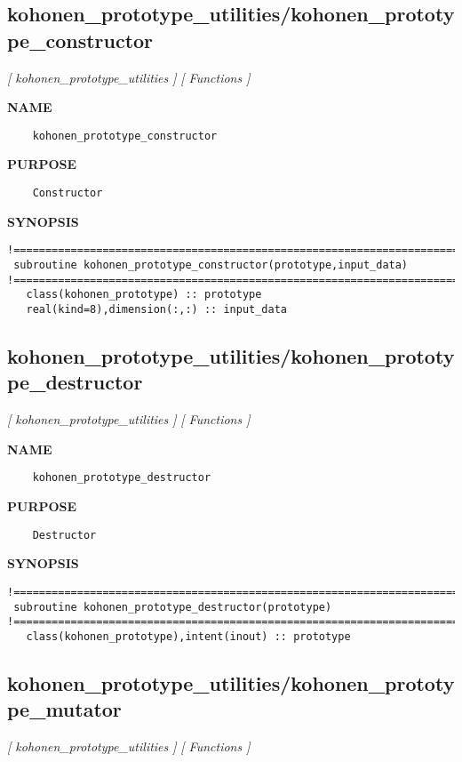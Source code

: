 \documentclass{article}
\begin{document}
\subsection{kohonen\_prototype\_utilities/kohonen\_prototype\_constructor}
\textsl{[ kohonen\_prototype\_utilities ]}
\textsl{[ Functions ]}

\label{ch:robo31}
\label{ch:kohonen_prototype_utilities_kohonen_prototype_constructor}
\textbf{NAME}
\begin{verbatim}
    kohonen_prototype_constructor
\end{verbatim}
\textbf{PURPOSE}
\begin{verbatim}
    Constructor
\end{verbatim}
\textbf{SYNOPSIS}
\begin{verbatim}
!========================================================================================
 subroutine kohonen_prototype_constructor(prototype,input_data)
!========================================================================================
   class(kohonen_prototype) :: prototype
   real(kind=8),dimension(:,:) :: input_data
\end{verbatim}
\newpage
\subsection{kohonen\_prototype\_utilities/kohonen\_prototype\_destructor}
\textsl{[ kohonen\_prototype\_utilities ]}
\textsl{[ Functions ]}

\label{ch:robo32}
\label{ch:kohonen_prototype_utilities_kohonen_prototype_destructor}
\textbf{NAME}
\begin{verbatim}
    kohonen_prototype_destructor
\end{verbatim}
\textbf{PURPOSE}
\begin{verbatim}
    Destructor
\end{verbatim}
\textbf{SYNOPSIS}
\begin{verbatim}
!========================================================================================
 subroutine kohonen_prototype_destructor(prototype)
!========================================================================================
   class(kohonen_prototype),intent(inout) :: prototype
\end{verbatim}
\newpage
\subsection{kohonen\_prototype\_utilities/kohonen\_prototype\_mutator}
\textsl{[ kohonen\_prototype\_utilities ]}
\textsl{[ Functions ]}
\end{document}
